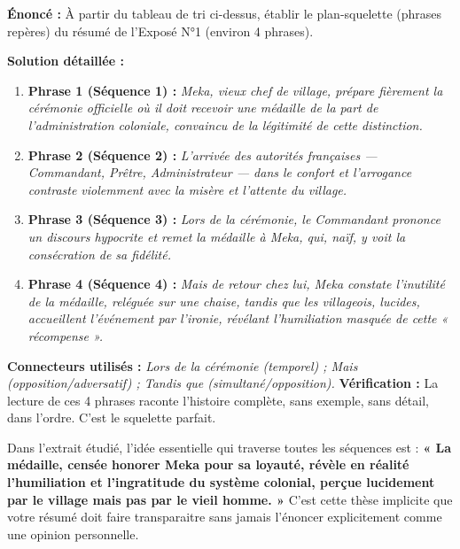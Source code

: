 \documentclass[11pt]{article}
\begin{document}
\begin{exoresolu}
\textbf{Énoncé :} À partir du tableau de tri ci-dessus, établir le plan-squelette (phrases repères) du résumé de l'Exposé N°1 (environ 4 phrases).

\textbf{Solution détaillée :}
\begin{enumerate}
\item \textbf{Phrase 1 (Séquence 1) :} \emph{Meka, vieux chef de village, prépare fièrement la cérémonie officielle où il doit recevoir une médaille de la part de l'administration coloniale, convaincu de la légitimité de cette distinction.}
\item \textbf{Phrase 2 (Séquence 2) :} \emph{L'arrivée des autorités françaises — Commandant, Prêtre, Administrateur — dans le confort et l'arrogance contraste violemment avec la misère et l'attente du village.}
\item \textbf{Phrase 3 (Séquence 3) :} \emph{Lors de la cérémonie, le Commandant prononce un discours hypocrite et remet la médaille à Meka, qui, naïf, y voit la consécration de sa fidélité.}
\item \textbf{Phrase 4 (Séquence 4) :} \emph{Mais de retour chez lui, Meka constate l'inutilité de la médaille, reléguée sur une chaise, tandis que les villageois, lucides, accueillent l'événement par l'ironie, révélant l'humiliation masquée de cette « récompense ».}
\end{enumerate}
\textbf{Connecteurs utilisés :} \emph{Lors de la cérémonie (temporel) ; Mais (opposition/adversatif) ; Tandis que (simultané/opposition).}
\textbf{Vérification :} La lecture de ces 4 phrases raconte l'histoire complète, sans exemple, sans détail, dans l'ordre. C'est le squelette parfait.
\end{exoresolu}

\begin{exemplebox}
Dans l'extrait étudié, l'idée essentielle qui traverse toutes les séquences est : \textbf{« La médaille, censée honorer Meka pour sa loyauté, révèle en réalité l'humiliation et l'ingratitude du système colonial, perçue lucidement par le village mais pas par le vieil homme. »} C'est cette thèse implicite que votre résumé doit faire transparaitre sans jamais l'énoncer explicitement comme une opinion personnelle.
\end{exemplebox}
\end{document}
